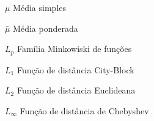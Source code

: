 \begin{simbolos}

\item[$\mu$]      Média simples
\item[$\bar{\mu}$]  Média ponderada
\item[{$L_p$}]   Família Minkowiski de funções
\item[{$L_1$}]   Função de distância City-Block
\item[{$L_2$}]   Função de distância Euclideana
\item[{$L_\infty$}] Função de distância de Chebyshev

\end{simbolos}